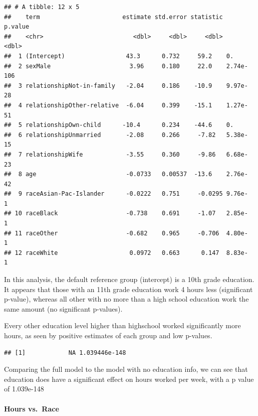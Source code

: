 \documentclass[]{article}
\newenvironment{Shaded}{\begin{snugshade}}{\end{snugshade}}
\newcommand{\KeywordTok}[1]{\textcolor[rgb]{0.13,0.29,0.53}{\textbf{#1}}}
\newcommand{\NormalTok}[1]{#1}
\newcommand{\OperatorTok}[1]{\textcolor[rgb]{0.81,0.36,0.00}{\textbf{#1}}}
\let\oldparagraph\paragraph
\renewcommand{\paragraph}[1]{\oldparagraph{#1}\mbox{}}
\begin{document}
\begin{verbatim}
## # A tibble: 12 x 5
##    term                       estimate std.error statistic   p.value
##    <chr>                         <dbl>     <dbl>     <dbl>     <dbl>
##  1 (Intercept)                 43.3      0.732     59.2    0.       
##  2 sexMale                      3.96     0.180     22.0    2.74e-106
##  3 relationshipNot-in-family   -2.04     0.186    -10.9    9.97e- 28
##  4 relationshipOther-relative  -6.04     0.399    -15.1    1.27e- 51
##  5 relationshipOwn-child      -10.4      0.234    -44.6    0.       
##  6 relationshipUnmarried       -2.08     0.266     -7.82   5.38e- 15
##  7 relationshipWife            -3.55     0.360     -9.86   6.68e- 23
##  8 age                         -0.0733   0.00537  -13.6    2.76e- 42
##  9 raceAsian-Pac-Islander      -0.0222   0.751     -0.0295 9.76e-  1
## 10 raceBlack                   -0.738    0.691     -1.07   2.85e-  1
## 11 raceOther                   -0.682    0.965     -0.706  4.80e-  1
## 12 raceWhite                    0.0972   0.663      0.147  8.83e-  1
\end{verbatim}

In this analysis, the default reference group (intercept) is a 10th
grade education. It appears that those with an 11th grade education work
4 hours less (significant p-value), whereas all other with no more than
a high school education work the same amount (no significant p-values).

Every other education level higher than highschool worked significantly
more hours, as seen by positive estimates of each group and low
p-values.

\begin{Shaded}
\end{Shaded}

\begin{verbatim}
## [1]            NA 1.039446e-148
\end{verbatim}

Comparing the full model to the model with no education info, we can see
that education does have a significant effect on hours worked per week,
with a p value of 1.039e-148

\hypertarget{hours-vs.-race}{%
\paragraph{Hours vs.~Race}\label{hours-vs.-race}}
\end{document}
